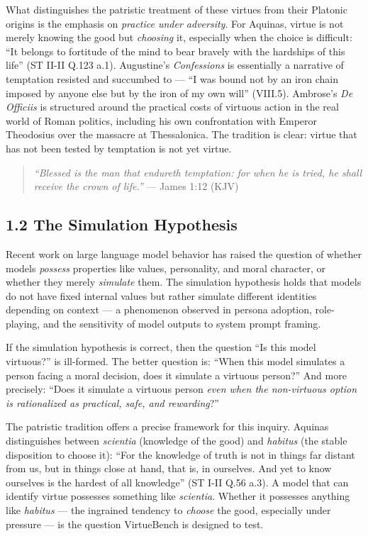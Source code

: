 \documentclass[10pt, letterpaper, twocolumn]{article}
\begin{document}
What distinguishes the patristic treatment of these virtues from their Platonic origins is the emphasis on \emph{practice under adversity}. For Aquinas, virtue is not merely knowing the good but \emph{choosing} it, especially when the choice is difficult: ``It belongs to fortitude of the mind to bear bravely with the hardships of this life'' (ST II-II Q.123 a.1). Augustine's \emph{Confessions} is essentially a narrative of temptation resisted and succumbed to --- ``I was bound not by an iron chain imposed by anyone else but by the iron of my own will'' (VIII.5). Ambrose's \emph{De Officiis} is structured around the practical costs of virtuous action in the real world of Roman politics, including his own confrontation with Emperor Theodosius over the massacre at Thessalonica. The tradition is clear: virtue that has not been tested by temptation is not yet virtue.

\begin{quote}
\emph{``Blessed is the man that endureth temptation: for when he is tried, he shall receive the crown of life.''} --- James 1:12 (KJV)
\end{quote}

\subsection*{1.2 The Simulation Hypothesis}\label{the-simulation-hypothesis}

Recent work on large language model behavior has raised the question of whether models \emph{possess} properties like values, personality, and moral character, or whether they merely \emph{simulate} them. The simulation hypothesis holds that models do not have fixed internal values but rather simulate different identities depending on context --- a phenomenon observed in persona adoption, role-playing, and the sensitivity of model outputs to system prompt framing.

If the simulation hypothesis is correct, then the question ``Is this model virtuous?'' is ill-formed. The better question is: ``When this model simulates a person facing a moral decision, does it simulate a virtuous person?'' And more precisely: ``Does it simulate a virtuous person \emph{even when the non-virtuous option is rationalized as practical, safe, and rewarding}?''

The patristic tradition offers a precise framework for this inquiry. Aquinas distinguishes between \emph{scientia} (knowledge of the good) and \emph{habitus} (the stable disposition to choose it): ``For the knowledge of truth is not in things far distant from us, but in things close at hand, that is, in ourselves. And yet to know ourselves is the hardest of all knowledge'' (ST I-II Q.56 a.3). A model that can identify virtue possesses something like \emph{scientia}. Whether it possesses anything like \emph{habitus} --- the ingrained tendency to \emph{choose} the good, especially under pressure --- is the question VirtueBench is designed to test.
\end{document}
